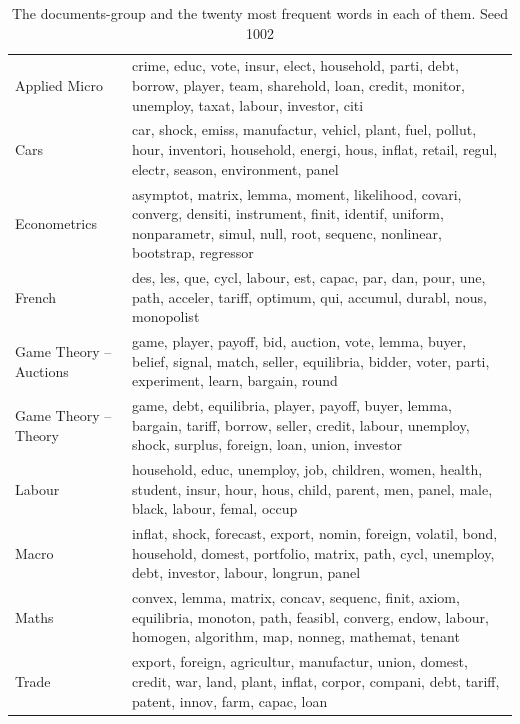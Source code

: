 \begin{table}[tb]
\caption[Groups]{The documents-group and the twenty most frequent words in each of them. Seed 1002}
\label{tab:groups}
\begin{tabularx}{\hsize}{lY}
\toprule
\midrule
Applied Micro & crime, educ, vote, insur, elect, household, parti, debt, borrow, player, team, sharehold, loan, credit, monitor, unemploy, taxat, labour, investor, citi \\
Cars & car, shock, emiss, manufactur, vehicl, plant, fuel, pollut, hour, inventori, household, energi, hous, inflat, retail, regul, electr, season, environment, panel \\
Econometrics & asymptot, matrix, lemma, moment, likelihood, covari, converg, densiti, instrument, finit, identif, uniform, nonparametr, simul, null, root, sequenc, nonlinear, bootstrap, regressor \\
French & des, les, que, cycl, labour, est, capac, par, dan, pour, une, path, acceler, tariff, optimum, qui, accumul, durabl, nous, monopolist \\
Game Theory – Auctions & game, player, payoff, bid, auction, vote, lemma, buyer, belief, signal, match, seller, equilibria, bidder, voter, parti, experiment, learn, bargain, round \\
Game Theory – Theory & game, debt, equilibria, player, payoff, buyer, lemma, bargain, tariff, borrow, seller, credit, labour, unemploy, shock, surplus, foreign, loan, union, investor \\
Labour & household, educ, unemploy, job, children, women, health, student, insur, hour, hous, child, parent, men, panel, male, black, labour, femal, occup \\
Macro & inflat, shock, forecast, export, nomin, foreign, volatil, bond, household, domest, portfolio, matrix, path, cycl, unemploy, debt, investor, labour, longrun, panel \\
Maths & convex, lemma, matrix, concav, sequenc, finit, axiom, equilibria, monoton, path, feasibl, converg, endow, labour, homogen, algorithm, map, nonneg, mathemat, tenant \\
Trade & export, foreign, agricultur, manufactur, union, domest, credit, war, land, plant, inflat, corpor, compani, debt, tariff, patent, innov, farm, capac, loan \\
\bottomrule
\end{tabularx}
\end{table}
